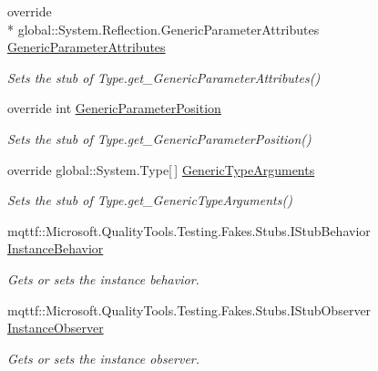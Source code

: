 \begin{DoxyCompactItemize}
override \\*
global\-::\-System.\-Reflection.\-Generic\-Parameter\-Attributes \hyperlink{class_system_1_1_fakes_1_1_stub_type_a00c6dc1cd76453aff11cd80ec2a24275}{Generic\-Parameter\-Attributes}
\begin{DoxyCompactList}\small\item\em Sets the stub of Type.\-get\-\_\-\-Generic\-Parameter\-Attributes()\end{DoxyCompactList}\item 
override int \hyperlink{class_system_1_1_fakes_1_1_stub_type_acf34896607d1a5294fda63973387d63a}{Generic\-Parameter\-Position}
\begin{DoxyCompactList}\small\item\em Sets the stub of Type.\-get\-\_\-\-Generic\-Parameter\-Position()\end{DoxyCompactList}\item 
override global\-::\-System.\-Type\mbox{[}$\,$\mbox{]} \hyperlink{class_system_1_1_fakes_1_1_stub_type_ae50f6de6d8e96b7e11dee9c8a216ac10}{Generic\-Type\-Arguments}
\begin{DoxyCompactList}\small\item\em Sets the stub of Type.\-get\-\_\-\-Generic\-Type\-Arguments()\end{DoxyCompactList}\item 
mqttf\-::\-Microsoft.\-Quality\-Tools.\-Testing.\-Fakes.\-Stubs.\-I\-Stub\-Behavior \hyperlink{class_system_1_1_fakes_1_1_stub_type_a1d4eb003867e6bc396b0b54e806c88ce}{Instance\-Behavior}
\begin{DoxyCompactList}\small\item\em Gets or sets the instance behavior.\end{DoxyCompactList}\item 
mqttf\-::\-Microsoft.\-Quality\-Tools.\-Testing.\-Fakes.\-Stubs.\-I\-Stub\-Observer \hyperlink{class_system_1_1_fakes_1_1_stub_type_a6793a6f12f655bb934a60e761fd24d53}{Instance\-Observer}
\begin{DoxyCompactList}\small\item\em Gets or sets the instance observer.\end{DoxyCompactList}\item 

\end{DoxyCompactItemize}
